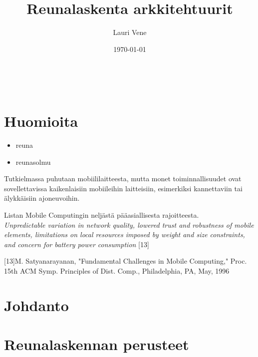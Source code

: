 \documentclass[finnish]{tktltiki2}
\title{Reunalaskenta arkkitehtuurit}
\author{Lauri Vene}
\date{\today}
\theoremstyle{definition}
\theoremstyle{remark}
\begin{document}

\frontmatter      %

\maketitle        %
\makeabstract     %

\tableofcontents  %
\


\mainmatter       %

\section{Huomioita}
\begin{itemize}
\item reuna
\item reunasolmu
\end{itemize}

Tutkielmassa puhutaan mobiililaitteesta, mutta monet toiminnallisuudet ovat sovellettavissa kaikenlaisiin mobiileihin laitteisiin, esimerkiksi kannettaviin tai älykkäisiin ajoneuvoihin. 

Listan Mobile Computingin neljästä pääasiallisesta rajoitteesta.\\
\textit{Unpredictable variation in network quality, lowered trust and robustness of
mobile elements, limitations on local resources imposed by
weight and size constraints, and concern for battery power
consumption} [13]

[13]M. Satyanarayanan, "Fundamental Challenges in Mobile Computing," Proc.
15th ACM Symp. Principles of Dist. Comp., Philadelphia, PA, May, 1996



\section{Johdanto}

\section{Reunalaskennan perusteet}
\end{document}
